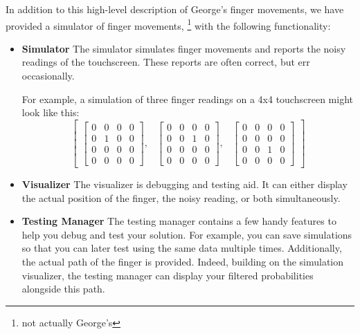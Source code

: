 \documentclass{article}
\begin{document}
In addition to this high-level description of George's finger movements,
we have provided a simulator of finger movements,%
\footnote{not actually George's}
with the following functionality:

\begin{itemize}
\item \textbf{Simulator}
  The simulator simulates finger movements
  and reports the noisy readings of the touchscreen.
  These reports are often correct, but err occasionally.
  
  For example, a simulation of three finger readings on a 4x4 touchscreen might look like this:
\[
\begin{bmatrix}
              \begin{bmatrix}
                  0 & 0 & 0 & 0 \\
                  0 & 1 & 0 & 0 \\
                  0 & 0 & 0 & 0 \\
                  0 & 0 & 0 & 0
              \end{bmatrix}, &
              \begin{bmatrix}
                  0 & 0 & 0 & 0 \\
                  0 & 0 & 1 & 0 \\
                  0 & 0 & 0 & 0 \\
                  0 & 0 & 0 & 0
              \end{bmatrix}, &
              \begin{bmatrix}
                  0 & 0 & 0 & 0 \\
                  0 & 0 & 0 & 0 \\
                  0 & 0 & 1 & 0 \\
                  0 & 0 & 0 & 0
              \end{bmatrix}
\end{bmatrix}
\]

\item \textbf{Visualizer}
  The visualizer is debugging and testing aid.
  It can either display the actual position of the finger, the noisy reading, or both simultaneously.
          
\item \textbf{Testing Manager}
The testing manager contains a few handy features to help you debug and test your solution.
For example, you can save simulations so that you can later test using the same data multiple times.
Additionally, the actual path of the finger is provided.
Indeed, building on the simulation visualizer,
the testing manager can display your filtered probabilities alongside this path.
\end{itemize}
\end{document}
